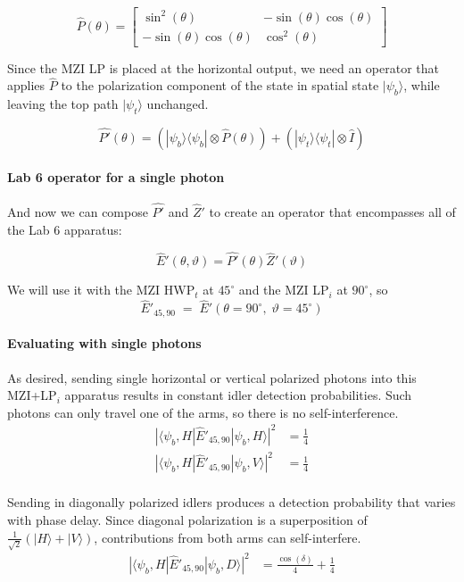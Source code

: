 \documentclass{article}
\begin{document}
$$\hat{P}(\theta) = \left[\begin{matrix}\sin^{2}{\left(\theta \right)} & - \sin{\left(\theta \right)} \cos{\left(\theta \right)}\\- \sin{\left(\theta \right)} \cos{\left(\theta \right)} & \cos^{2}{\left(\theta \right)}\end{matrix}\right]$$


Since the MZI LP is placed at the horizontal output, 
we need an operator that applies $\hat{P}$
to the polarization component of the state in spatial state $|\psi_b\rangle$,
while leaving the top path $|\psi_t\rangle$ unchanged.

$$  \hat{P'}(\theta) = (|\psi_b\rangle\langle\psi_b| \otimes \hat{P}(\theta)) + (|\psi_t\rangle\langle\psi_t| \otimes \hat{I}) $$

\paragraph{Lab 6 operator for a single photon}
And now we can compose $\hat{P'}$ and $\hat{Z}'$
to create an operator that encompasses all of the Lab 6 apparatus:

$$\hat{E}'(\theta,\vartheta) = \hat{P'}(\theta) \hat{Z}'(\vartheta)$$

We will use it with the MZI HWP$_t$ at $45^\circ$ and the
MZI LP$_i$ at $90^\circ$, so
$$
\hat{E}'_{45,90}\;=\;
\hat{E}'\!\left(\theta=90^\circ,\;\vartheta=45^\circ\right)
$$


\paragraph{Evaluating with single photons}

As desired, sending single horizontal or vertical polarized photons into
this MZI+LP$_i$ apparatus results in constant idler detection probabilities.
Such photons can only travel one of the arms, so there is no self-interference.
\begin{align*}
|\langle \psi_b,H |\hat{E}'_{45,90} |\psi_b, H\rangle|^2 &= \frac{1}{4} \\
|\langle \psi_b,H |\hat{E}'_{45,90} |\psi_b, V\rangle|^2 &= \frac{1}{4} \\
\end{align*}

Sending in diagonally polarized idlers produces a detection
probability that varies with phase delay.
Since diagonal polarization is a superposition of
$\frac{1}{\sqrt2}(|H\rangle+|V\rangle)$,
contributions from both arms can self-interfere.
\begin{align*}
|\langle \psi_b,H |\hat{E}'_{45,90} |\psi_b, D\rangle|^2 &= \frac{\cos{\left(\delta \right)}}{4} + \frac{1}{4}
\end{align*}
\end{document}
